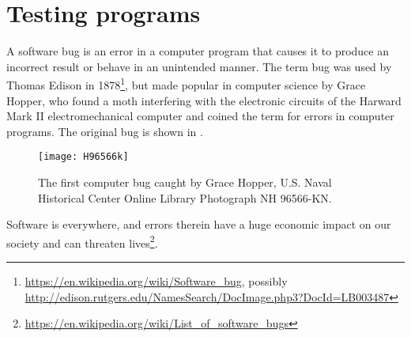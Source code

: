 \chapter{Testing programs}
\label{chap:testing}
A software bug is an error in a computer program that causes it to produce an incorrect result or behave in an unintended manner. The term bug was used by Thomas Edison in 1878\footnote{\url{https://en.wikipedia.org/wiki/Software_bug}, possibly \url{http://edison.rutgers.edu/NamesSearch/DocImage.php3?DocId=LB003487}}, but made popular in computer science by Grace Hopper, who found a moth interfering with the electronic circuits of the Harward Mark II electromechanical computer and coined the term  for errors in computer programs. The original bug is shown in .
\begin{figure}
  \centering
  \texttt{[image: H96566k]}
  \caption{The first computer bug caught by Grace Hopper, U.S. Naval Historical Center Online Library Photograph NH 96566-KN.}
  \label{fig:bug}
\end{figure}
Software is everywhere, and errors therein have a huge economic impact on our society and can threaten lives\footnote{\url{https://en.wikipedia.org/wiki/List_of_software_bugs}}.

